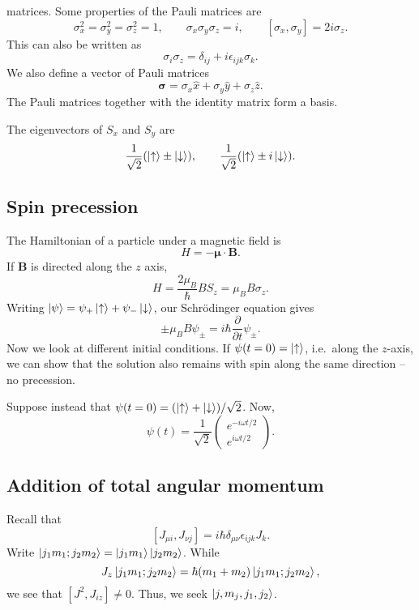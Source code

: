 \documentclass[11pt]{article}
\newcommand\ve[1]{\boldsymbol{#1}}
\newcommand\ppt[1]{\frac{\partial #1}{\partial t}}
\theoremstyle{definition}
\theoremstyle{remark}
\numberwithin{equation}{section}
\begin{document}
    matrices. Some properties of the Pauli matrices are \[
        \sigma_x^2 = \sigma_y^2 = \sigma_z^2 = 1, \qquad 
        \sigma_x\sigma_y\sigma_z = i, \qquad
        [\sigma_x, \sigma_y] = 2i\sigma_z.
    \] This can also be written as \[
        \sigma_i\sigma_z = \delta_{ij} + i\epsilon_{ijk}\sigma_k.
    \] We also define a vector of Pauli matrices \[
        \ve{\sigma} = \sigma_x\hat{x} + \sigma_y\hat{y} + \sigma_z\hat{z}.
    \] The Pauli matrices together with the identity matrix form a basis.

    The eigenvectors of $S_x$ and $S_y$ are \[
        \frac{1}{\sqrt{2}}(\ket{\uparrow} \pm \ket{\downarrow}), \qquad
        \frac{1}{\sqrt{2}}(\ket{\uparrow} \pm i\ket{\downarrow}).
    \] 

    \subsection{Spin precession}
    The Hamiltonian of a particle under a magnetic field is \[
        H = -\ve{\mu}\cdot \ve{B}.
    \] If $\ve{B}$ is directed along the $z$ axis, \[
        H = \frac{2\mu_B}{\hbar}BS_z = \mu_BB\sigma_z.
    \] Writing $\ket{\psi} = \psi_+\ket{\uparrow} + \psi_-\ket{\downarrow}$, our
    Schr\"odinger equation gives \[
        \pm\mu_BB\psi_{\pm} = i\hbar\ppt{}\psi_{\pm}.
    \] Now we look at different initial conditions. If $\psi(t = 0) =
    \ket{\uparrow}$, i.e.\ along the $z$-axis, we can show that the solution also
    remains with spin along the same direction -- no precession.

    Suppose instead that $\psi(t = 0) = (\ket{\uparrow} + \ket{\downarrow}) /
    \sqrt{2}$. Now, \[
        \psi(t) = \frac{1}{\sqrt{2}}\begin{pmatrix}
            e^{-i\omega t / 2} \\ e^{i\omega t / 2}
        \end{pmatrix}.
    \] 

    \subsection{Addition of total angular momentum}
    Recall that \[
        [J_{\mu i}, J_{\nu j}] = i\hbar \delta_{\mu\nu}\epsilon_{ijk}J_k.
    \] Write $\ket{j_1m_1;j_2m_2} = \ket{j_1m_1}\ket{j_2m_2}$. While \[
        J_z\ket{j_1m_1;j_2m_2} = \hbar(m_1 + m_2)\ket{j_1m_1;j_2m_2},
    \] we see that $[J^2, J_{iz}] \neq 0$. Thus, we seek $\ket{j, m_j, j_1, j_2}$.
\end{document}
